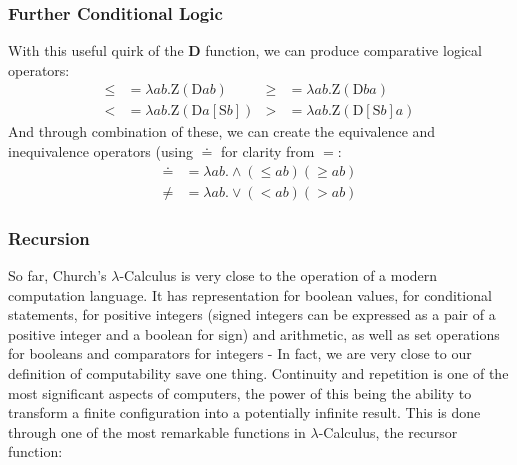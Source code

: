 \documentclass {article}
\begin{document}
\subsubsection{Further Conditional Logic}

With this useful quirk of the \textbf{D} function, we can produce comparative logical operators:
\begin{equation*}
\begin{aligned}
\bm{\leq} &= \lambda ab.\bm{\mathrm{Z}}(\bm{\mathrm{D}}ab)
  & %
\bm{\geq} &= \lambda ab.\bm{\mathrm{Z}}(\bm{\mathrm{D}}ba)
  \\
\bm{<} &= \lambda ab.\bm{\mathrm{Z}}(\bm{\mathrm{D}}a[\bm{\mathrm{S}}b])
  &
\bm{>} &= \lambda ab.\bm{\mathrm{Z}}(\bm{\mathrm{D}}[\bm{\mathrm{S}}b]a)
\end{aligned}
\end{equation*}
And through combination of these, we can create the equivalence and inequivalence operators (using $\bm{\doteq}$ for clarity from $=$:
\begin{equation*}
\begin{aligned}
\bm{\doteq} &= \lambda ab.\wedge(\bm{\leq}ab)(\bm{\geq}ab)\\
\bm{\neq} &= \lambda ab.\vee(\bm{<}ab)(\bm{>}ab)
\end{aligned}
\end{equation*}
\subsubsection{Recursion}

So far, Church's $\lambda$-Calculus is very close to the operation of a modern computation language. It has representation for boolean values, for conditional statements, for positive integers (signed integers can be expressed as a pair of a positive integer and a boolean for sign) and arithmetic, as well as set operations for booleans and comparators for integers - In fact, we are very close to our definition of computability save one thing. Continuity and repetition is one of the most significant aspects of computers, the power of this being the ability to transform a finite configuration into a potentially infinite result. This is done through one of the most remarkable functions in $\lambda$-Calculus, the recursor function:
\end{document}
